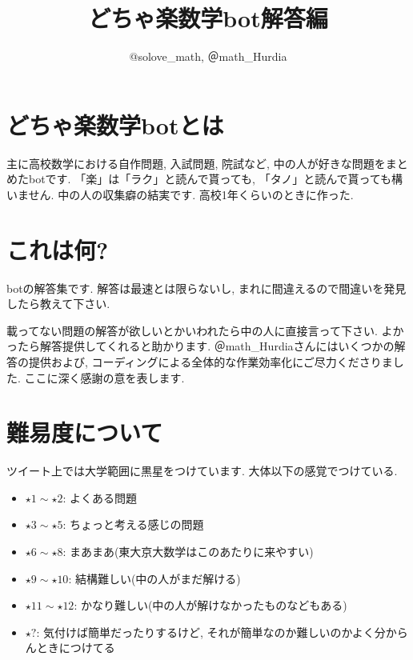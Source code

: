 \documentclass[twocolumn]{jsarticle}
\begin{document}
\fontsize{9pt}{7pt}\selectfont
\lengthparam
\onecolumn


\begin{titlepage}
\title{どちゃ楽数学bot解答編}
\author{@solove\_math, ＠math\_Hurdia}
\maketitle
\onecolumn
\thispagestyle{empty}
\end{titlepage}


\section{どちゃ楽数学botとは}
主に高校数学における自作問題, 入試問題, 院試など, 中の人が好きな問題をまとめたbotです. 「楽」は「ラク」と読んで貰っても, 「タノ」と読んで貰っても構いません. 中の人の収集癖の結実です. 高校1年くらいのときに作った.  

\section{これは何?}
botの解答集です. 解答は最速とは限らないし, まれに間違えるので間違いを発見したら教えて下さい.\par
載ってない問題の解答が欲しいとかいわれたら中の人に直接言って下さい. よかったら解答提供してくれると助かります. ＠math\_Hurdiaさんにはいくつかの解答の提供および, コーディングによる全体的な作業効率化にご尽力くださりました. ここに深く感謝の意を表します.  

\section{難易度について}
ツイート上では大学範囲に黒星をつけています. 大体以下の感覚でつけている. 
\begin{itemize}
\item $\star 1 \sim \star 2$: よくある問題
\item $\star 3\sim \star 5$: ちょっと考える感じの問題
\item $\star 6 \sim \star 8$: まあまあ(東大京大数学はこのあたりに来やすい)  
\item $\star 9 \sim \star 10$: 結構難しい(中の人がまだ解ける)
\item $\star 11 \sim \star 12$: かなり難しい(中の人が解けなかったものなどもある)
\item $\star ?$: 気付けば簡単だったりするけど, それが簡単なのか難しいのかよく分からんときにつけてる
\end{itemize} 
\end{document}
